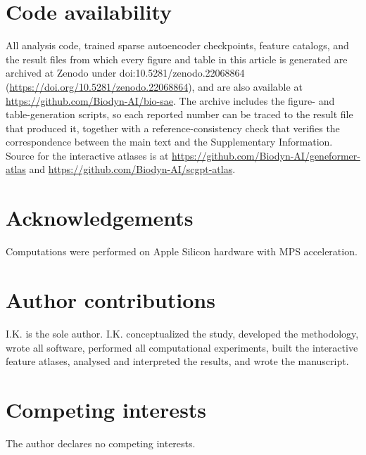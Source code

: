 \section*{Code availability}
All analysis code, trained sparse autoencoder checkpoints, feature catalogs, and the result files
from which every figure and table in this article is generated are archived at Zenodo under
doi:10.5281/zenodo.22068864 (\url{https://doi.org/10.5281/zenodo.22068864}), and are also
available at
\url{https://github.com/Biodyn-AI/bio-sae}. The archive includes the figure- and
table-generation scripts, so each reported number can be traced to the result file that produced
it, together with a reference-consistency check that verifies the correspondence between the main
text and the Supplementary Information. Source for the interactive atlases is at
\url{https://github.com/Biodyn-AI/geneformer-atlas} and
\url{https://github.com/Biodyn-AI/scgpt-atlas}.

\section*{Acknowledgements}
Computations were performed on Apple Silicon hardware with MPS acceleration.

\section*{Author contributions}
I.K. is the sole author. I.K. conceptualized the study, developed the methodology, wrote all
software, performed all computational experiments, built the interactive feature atlases,
analysed and interpreted the results, and wrote the manuscript.

\section*{Competing interests}
The author declares no competing interests.
